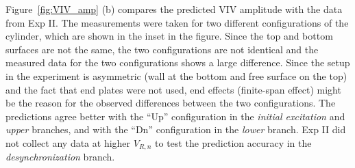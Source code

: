 Figure~\ref{fig:VIV_amp} (b) compares the predicted VIV amplitude with the data
from Exp II. The measurements were taken for two different configurations of
the cylinder, which are shown in the inset in the figure. Since the top and
bottom surfaces are not the same, the two configurations are not identical and
the measured data for the two configurations shows a large difference. Since
the setup in the experiment is asymmetric (wall at the bottom and free surface
on the top) and the fact that end plates were not used, end effects
(finite-span effect) might be the reason for the observed differences between
the two configurations. The predictions agree better with the ``Up''
configuration in the {\em initial excitation} and {\em upper} branches, and
with the ``Dn'' configuration in the {\em lower} branch. Exp II did not collect
any data at higher $V_{R,n}$ to test the prediction accuracy in the {\em
desynchronization} branch.

